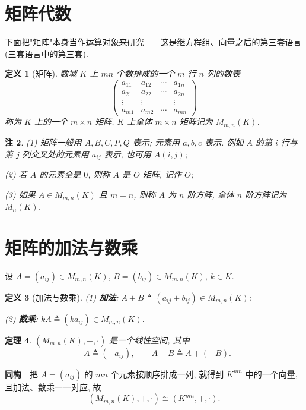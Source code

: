 \documentclass[UTF8,11pt]{ctexart}
\theoremstyle{cnthm}
\newtheorem{thm}{定理}[section]
\newtheorem{defn}[thm]{定义}
\newtheorem{rem}[thm]{注}
\begin{document}
\section{矩阵代数}

下面把"矩阵"本身当作运算对象来研究——这是继方程组、向量之后的第三套语言(三套语言中的第三套).

\begin{defn}[矩阵]
数域 $K$ 上 $mn$ 个数排成的一个 $m$ 行 $n$ 列的数表
\[
\begin{pmatrix}
a_{11}&a_{12}&\cdots&a_{1n}\\
a_{21}&a_{22}&\cdots&a_{2n}\\
\vdots&\vdots&&\vdots\\
a_{m1}&a_{m2}&\cdots&a_{mn}
\end{pmatrix}
\]
称为 $K$ 上的一个 $m\times n$ 矩阵. $K$ 上全体 $m\times n$ 矩阵记为 $M_{m,n}(K)$.
\end{defn}

\begin{rem}
(1) 矩阵一般用 $A,B,C,P,Q$ 表示; 元素用 $a,b,c$ 表示. 例如 $A$ 的第 $i$ 行与第 $j$ 列交叉处的元素用 $a_{ij}$ 表示, 也可用 $A(i,j)$;

(2) 若 $A$ 的元素全是 $0$, 则称 $A$ 是 $O$ 矩阵, 记作 $O$;

(3) 如果 $A\in M_{m,n}(K)$ 且 $m=n$, 则称 $A$ 为 $n$ 阶方阵, 全体 $n$ 阶方阵记为 $M_n(K)$.
\end{rem}

\section{矩阵的加法与数乘}

设 $A=(a_{ij})\in M_{m,n}(K)$, $B=(b_{ij})\in M_{m,n}(K)$, $k\in K$.

\begin{defn}[加法与数乘]
(1) \textbf{加法}: $A+B\triangleq(a_{ij}+b_{ij})\in M_{m,n}(K)$;

(2) \textbf{数乘}: $kA\triangleq(ka_{ij})\in M_{m,n}(K)$.
\end{defn}

\begin{thm}
$(M_{m,n}(K),+,\cdot)$ 是一个线性空间, 其中
\[
-A\triangleq(-a_{ij}),\qquad A-B\triangleq A+(-B).
\]
\end{thm}

\textbf{同构}　把 $A=(a_{ij})$ 的 $mn$ 个元素按顺序排成一列, 就得到 $K^{mn}$ 中的一个向量, 且加法、数乘一一对应, 故
\[
(M_{m,n}(K),+,\cdot)\cong(K^{mn},+,\cdot).
\]
\end{document}
